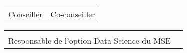 \vspace{2cm}

{ \renewcommand{\arraystretch}{1.5}
\begin{tabularx}{\textwidth}{X X}
	\Advisor  & \CoAdvisor \\
	Conseiller   & Co-conseiller\\
\end{tabularx}
}

\vspace{0.4cm}

{ \renewcommand{\arraystretch}{1.5}
\vspace{1cm}
\begin{tabularx}{\textwidth}{X X}
	\Dean\\ 
	Responsable de l'option Data Science du MSE\\
\end{tabularx}
}
